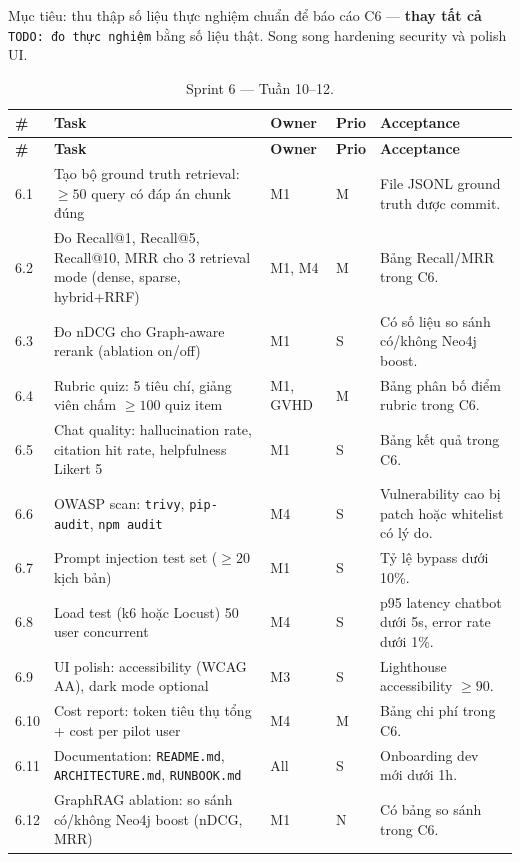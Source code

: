 Mục tiêu: thu thập số liệu thực nghiệm chuẩn để báo cáo C6 ---
\textbf{thay tất cả} \texttt{TODO: đo thực nghiệm} bằng số liệu thật.
Song song hardening security và polish UI.

\begin{longtable}{|p{0.7cm}|p{6.3cm}|p{1.2cm}|p{1cm}|p{3cm}|}
    \caption{Sprint 6 --- Tuần 10--12.}
    \label{tab:sprint6-gd2} \\
    \hline
    \textbf{\#} & \textbf{Task} & \textbf{Owner} & \textbf{Prio} & \textbf{Acceptance} \\
    \hline
    \endfirsthead
    \hline
    \textbf{\#} & \textbf{Task} & \textbf{Owner} & \textbf{Prio} & \textbf{Acceptance} \\
    \hline
    \endhead

    6.1 & Tạo bộ ground truth retrieval: $\geq 50$ query có đáp án chunk đúng & M1 & M & File JSONL ground truth được commit. \\ \hline
    6.2 & Đo Recall@1, Recall@5, Recall@10, MRR cho 3 retrieval mode (dense, sparse, hybrid+RRF) & M1, M4 & M & Bảng Recall/MRR trong C6. \\ \hline
    6.3 & Đo nDCG cho Graph-aware rerank (ablation on/off) & M1 & S & Có số liệu so sánh có/không Neo4j boost. \\ \hline
    6.4 & Rubric quiz: 5 tiêu chí, giảng viên chấm $\geq 100$ quiz item & M1, GVHD & M & Bảng phân bố điểm rubric trong C6. \\ \hline
    6.5 & Chat quality: hallucination rate, citation hit rate, helpfulness Likert 5 & M1 & S & Bảng kết quả trong C6. \\ \hline
    6.6 & OWASP scan: \texttt{trivy}, \texttt{pip-audit}, \texttt{npm audit} & M4 & S & Vulnerability cao bị patch hoặc whitelist có lý do. \\ \hline
    6.7 & Prompt injection test set ($\geq 20$ kịch bản) & M1 & S & Tỷ lệ bypass dưới 10\%. \\ \hline
    6.8 & Load test (k6 hoặc Locust) 50 user concurrent & M4 & S & p95 latency chatbot dưới 5s, error rate dưới 1\%. \\ \hline
    6.9 & UI polish: accessibility (WCAG AA), dark mode optional & M3 & S & Lighthouse accessibility $\geq 90$. \\ \hline
    6.10 & Cost report: token tiêu thụ tổng + cost per pilot user & M4 & M & Bảng chi phí trong C6. \\ \hline
    6.11 & Documentation: \texttt{README.md}, \texttt{ARCHITECTURE.md}, \texttt{RUNBOOK.md} & All & S & Onboarding dev mới dưới 1h. \\ \hline
    6.12 & GraphRAG ablation: so sánh có/không Neo4j boost (nDCG, MRR) & M1 & N & Có bảng so sánh trong C6. \\ \hline
\end{longtable}

